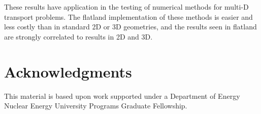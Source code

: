 \documentclass{anstrans}
\begin{document}
These results have application in the testing of numerical methods for multi-D
transport problems. The flatland implementation of these methods is easier and
less costly than in standard 2D or 3D geometries, and the results seen in
flatland are strongly correlated to results in 2D and 3D.

\section{Acknowledgments}
This material is based upon work supported under a Department of Energy Nuclear
Energy University Programs Graduate Fellowship.



\end{document}
